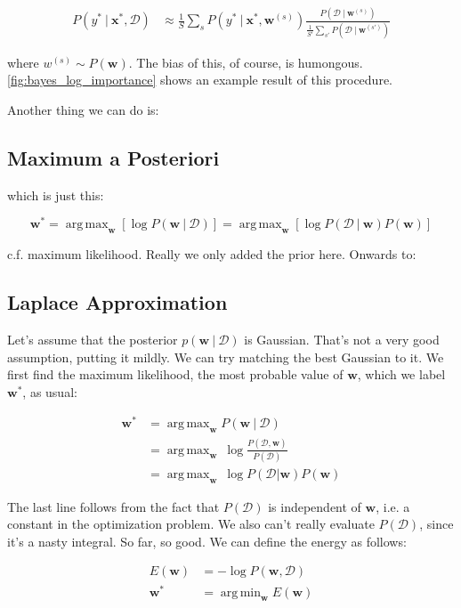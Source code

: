 \documentclass{article}
\newcommand{\vf}[1]{\mathbf{#1}}
\newcommand{\bx}{\vf{x}}
\newcommand{\bw}{\vf{w}}
\newcommand{\giv}{\ |\ }
\newcommand{\data}{\mathcal{D}}
\DeclareMathOperator*{\argmax}{arg\,max}
\DeclareMathOperator*{\argmin}{arg\,min}
\begin{document}
\begin{align*}
    P(y^* \giv \bx^*, \data) &\approx
        \frac{1}{S} \sum_s P(y^* \giv \bx^*, \bw^{(s)}) \frac{
            P(\data \giv \bw^{(s)})
        }{
            \frac{1}{S'} \sum_{s'} P(\data \giv \bw^{(s')})
        }
\end{align*}

where $w^{(s)} \sim P(\bw)$. The bias of this, of course, is humongous. \autoref{fig:bayes_log_importance} shows an example result of this procedure.
\vskip 0.1in

Another thing we can do is:

\subsection{Maximum a Posteriori}
which is just this:

\begin{equation*}
    \bw^* = \argmax_\bw[\log P(\bw \giv \data)] =
        \argmax_\bw[\log P(\data \giv \bw) P(\bw)]
\end{equation*}

c.f. maximum likelihood. Really we only added the prior here. Onwards to:

\subsection{Laplace Approximation}
Let's assume that the posterior $p(\bw \giv \data)$ is Gaussian. That's not a very good assumption, putting it mildly. We can try matching the best Gaussian to it. We first find the maximum likelihood, the most probable value of $\bw$, which we label $\bw^*$, as usual:

\begin{align*}
    \bw^* &= \argmax_\bw P(\bw \giv \data) \\
        &= \argmax_\bw\ \log \frac{P(\data, \bw)}{P(\data)} \\
        &= \argmax_\bw\ \log P(\data | \bw) P(\bw)
\end{align*}

The last line follows from the fact that $P(\data)$ is independent of $\bw$, i.e. a constant in the optimization problem. We also can't really evaluate $P(\data)$, since it's a nasty integral. So far, so good. We can define the energy as follows:

\begin{align*}
    E(\bw) &= -\log P(\bw, \data) \\
    \bw^* &= \argmin_\bw E(\bw)
\end{align*}
\end{document}
